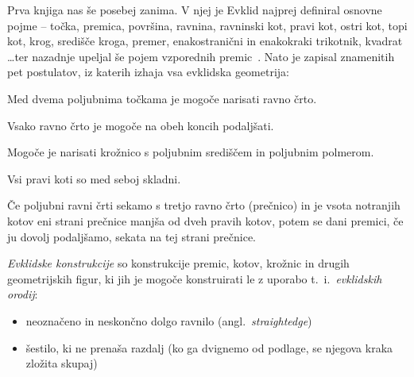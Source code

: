 Prva knjiga nas še posebej zanima. V njej je Evklid najprej definiral osnovne pojme -- točka, premica, površina, ravnina, ravninski kot, pravi kot, ostri kot, topi kot, krog, središče kroga, premer, enakostranični in enakokraki trikotnik, kvadrat \ldots ter nazadnje upeljal še pojem vzporednih premic~\cite{euclidI}. Nato je zapisal znamenitih pet postulatov, iz katerih izhaja vsa evklidska geometrija:

\renewcommand{\thepostulat}{P\arabic{postulat}}

\begin{postulat}
    \label{post:P1}
    Med dvema poljubnima točkama je mogoče narisati ravno črto.
\end{postulat}
\begin{postulat}
    \label{post:P2}
    Vsako ravno črto je mogoče na obeh koncih podaljšati.
\end{postulat}
\begin{postulat}
    \label{post:P3}
    Mogoče je narisati krožnico s poljubnim središčem in poljubnim polmerom.
\end{postulat}
\begin{postulat}
    \label{post:P4}
    Vsi pravi koti so med seboj skladni.
\end{postulat}
\begin{postulat}
    \label{post:P5}
    Če poljubni ravni črti sekamo s tretjo ravno črto (prečnico) in je vsota notranjih kotov eni strani prečnice manjša od dveh pravih kotov, potem se dani premici, če ju dovolj podaljšamo, sekata na tej strani prečnice.
\end{postulat}

\begin{definicija}
    \emph{Evklidske konstrukcije} so konstrukcije premic, kotov, krožnic in drugih geometrijskih figur, ki jih je mogoče konstruirati le z uporabo t.\ i.\ \emph{evklidskih orodij}:
    \begin{itemize}
        \item neoznačeno in neskončno dolgo ravnilo (angl.\ \emph{straightedge})
        \item šestilo, ki ne prenaša razdalj (ko ga dvignemo od podlage, se njegova kraka zložita skupaj)
    \end{itemize}
\end{definicija}

